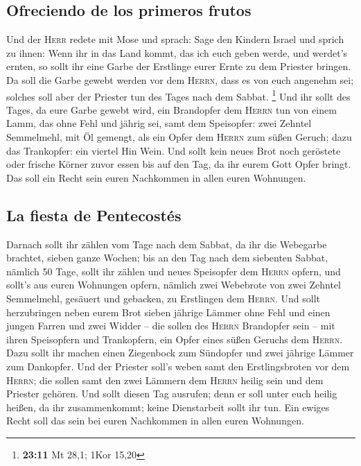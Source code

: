 \hypertarget{ofreciendo-de-los-primeros-frutos}{%
\subsection{Ofreciendo de los primeros
frutos}\label{ofreciendo-de-los-primeros-frutos}}

 Und der \textsc{Herr} redete mit Mose und sprach:
 Sage den Kindern Israel und sprich zu ihnen: Wenn ihr in
das Land kommt, das ich euch geben werde, und werdet's ernten, so sollt
ihr eine Garbe der Erstlinge eurer Ernte zu dem Priester bringen.
 Da soll die Garbe gewebt werden vor dem \textsc{Herrn},
dass es von euch angenehm sei; solches soll aber der Priester tun des
Tages nach dem Sabbat. \footnote{\textbf{23:11} Mt 28,1; 1Kor 15,20}
 Und ihr sollt des Tages, da eure Garbe gewebt wird, ein
Brandopfer dem \textsc{Herrn} tun von einem Lamm, das ohne Fehl und
jährig sei,  samt dem Speisopfer: zwei Zehntel
Semmelmehl, mit Öl gemengt, als ein Opfer dem \textsc{Herrn} zum süßen
Geruch; dazu das Trankopfer: ein viertel Hin Wein.  Und
sollt kein neues Brot noch geröstete oder frische Körner zuvor essen bis
auf den Tag, da ihr eurem Gott Opfer bringt. Das soll ein Recht sein
euren Nachkommen in allen euren Wohnungen.

\hypertarget{la-fiesta-de-pentecostuxe9s}{%
\subsection{La fiesta de
Pentecostés}\label{la-fiesta-de-pentecostuxe9s}}

 Darnach sollt ihr zählen vom Tage nach dem Sabbat, da
ihr die Webegarbe brachtet, sieben ganze Wochen;  bis an
den Tag nach dem siebenten Sabbat, nämlich 50 Tage, sollt ihr zählen und
neues Speisopfer dem \textsc{Herrn} opfern,  und sollt's
aus euren Wohnungen opfern, nämlich zwei Webebrote von zwei Zehntel
Semmelmehl, gesäuert und gebacken, zu Erstlingen dem \textsc{Herrn}.
 Und sollt herzubringen neben eurem Brot sieben jährige
Lämmer ohne Fehl und einen jungen Farren und zwei Widder -- die sollen
des \textsc{Herrn} Brandopfer sein -- mit ihren Speisopfern und
Trankopfern, ein Opfer eines süßen Geruchs dem \textsc{Herrn}.
 Dazu sollt ihr machen einen Ziegenbock zum Sündopfer und
zwei jährige Lämmer zum Dankopfer.  Und der Priester
soll's weben samt den Erstlingsbroten vor dem \textsc{Herrn}; die sollen
samt den zwei Lämmern dem \textsc{Herrn} heilig sein und dem Priester
gehören.  Und sollt diesen Tag ausrufen; denn er soll
unter euch heilig heißen, da ihr zusammenkommt; keine Dienstarbeit sollt
ihr tun. Ein ewiges Recht soll das sein bei euren Nachkommen in allen
euren Wohnungen.

